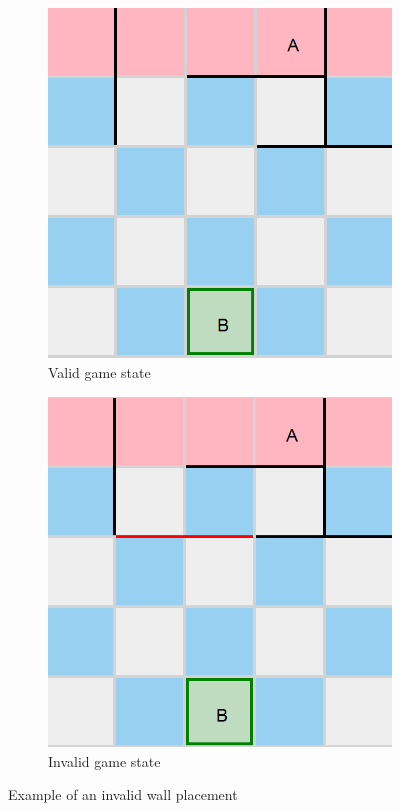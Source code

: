 \begin{figure}[h]
    \begin{subfigure}{0.4\textwidth}
      \includegraphics[width=\textwidth]{../img/GameBoard/arbitrary_state.png}
      \caption{Valid game state}
      \label{fig:ValidState}
    \end{subfigure}
    \hfill
    \begin{subfigure}{0.4\textwidth}
      \includegraphics[width=\textwidth]{../img/GameBoard/invalid_wall.png}
      \caption{Invalid game state}
      \label{fig:WallBlocked}
    \end{subfigure}
    \caption{Example of an invalid wall placement}
    \label{fig:WallBlockingMove}
\end{figure}

